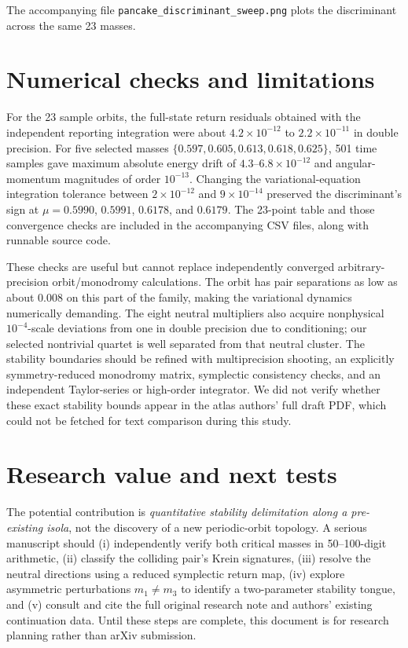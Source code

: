 \documentclass[10pt]{article}
\begin{document}
\noindent The accompanying file \texttt{pancake\_discriminant\_sweep.png} plots the discriminant across the same 23 masses.



\section{Numerical checks and limitations}
For the 23 sample orbits, the full-state return residuals obtained with the independent reporting integration were about $4.2\times10^{-12}$ to $2.2\times10^{-11}$ in double precision. For five selected masses $\{0.597,0.605,0.613,0.618,0.625\}$, 501 time samples gave maximum absolute energy drift of $4.3$--$6.8\times10^{-12}$ and angular-momentum magnitudes of order $10^{-13}$. Changing the variational-equation integration tolerance between $2\times10^{-12}$ and $9\times10^{-14}$ preserved the discriminant's sign at $\mu=0.5990$, $0.5991$, $0.6178$, and $0.6179$. The 23-point table and those convergence checks are included in the accompanying CSV files, along with runnable source code.

These checks are useful but cannot replace independently converged arbitrary-precision orbit/monodromy calculations. The orbit has pair separations as low as about $0.008$ on this part of the family, making the variational dynamics numerically demanding. The eight neutral multipliers also acquire nonphysical $10^{-4}$-scale deviations from one in double precision due to conditioning; our selected nontrivial quartet is well separated from that neutral cluster. The stability boundaries should be refined with multiprecision shooting, an explicitly symmetry-reduced monodromy matrix, symplectic consistency checks, and an independent Taylor-series or high-order integrator. We did not verify whether these exact stability bounds appear in the atlas authors' full draft PDF, which could not be fetched for text comparison during this study.

\section{Research value and next tests}
The potential contribution is \emph{quantitative stability delimitation along a pre-existing isola}, not the discovery of a new periodic-orbit topology. A serious manuscript should (i) independently verify both critical masses in 50--100-digit arithmetic, (ii) classify the colliding pair's Krein signatures, (iii) resolve the neutral directions using a reduced symplectic return map, (iv) explore asymmetric perturbations $m_1\ne m_3$ to identify a two-parameter stability tongue, and (v) consult and cite the full original research note and authors' existing continuation data. Until these steps are complete, this document is for research planning rather than arXiv submission.
\end{document}
